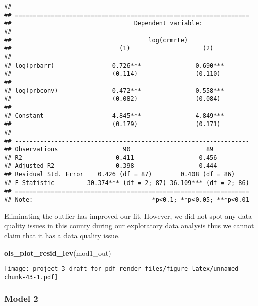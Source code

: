\documentclass[]{article}
\newenvironment{Shaded}{\begin{snugshade}}{\end{snugshade}}
\newcommand{\KeywordTok}[1]{\textcolor[rgb]{0.13,0.29,0.53}{\textbf{#1}}}
\newcommand{\NormalTok}[1]{#1}
\begin{document}
\begin{verbatim}
## 
## =================================================================
##                                  Dependent variable:             
##                     ---------------------------------------------
##                                      log(crmrte)                 
##                              (1)                    (2)          
## -----------------------------------------------------------------
## log(prbarr)               -0.726***              -0.690***       
##                            (0.114)                (0.110)        
##                                                                  
## log(prbconv)              -0.472***              -0.558***       
##                            (0.082)                (0.084)        
##                                                                  
## Constant                  -4.845***              -4.849***       
##                            (0.179)                (0.171)        
##                                                                  
## -----------------------------------------------------------------
## Observations                  90                     89          
## R2                          0.411                  0.456         
## Adjusted R2                 0.398                  0.444         
## Residual Std. Error    0.426 (df = 87)        0.408 (df = 86)    
## F Statistic         30.374*** (df = 2; 87) 36.109*** (df = 2; 86)
## =================================================================
## Note:                                 *p<0.1; **p<0.05; ***p<0.01
\end{verbatim}

Eliminating the outlier has improved our fit. However, we did not spot
any data quality issues in this county during our exploratory data
analysis thus we cannot claim that it has a data quality issue.

\begin{Shaded}
\begin{Highlighting}[]
\KeywordTok{ols_plot_resid_lev}\NormalTok{(mod1_out)}
\end{Highlighting}
\end{Shaded}

\texttt{[image: project\_3\_draft\_for\_pdf\_render\_files/figure-latex/unnamed-chunk-43-1.pdf]}

\hypertarget{model-2}{%
\subsubsection{Model 2}\label{model-2}}
\end{document}
